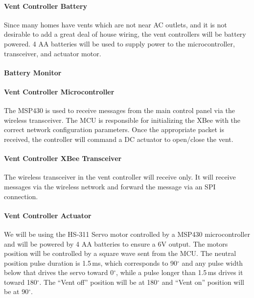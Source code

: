 \paragraph{Vent Controller Battery}
Since many homes have vents which are not near AC outlets, and it is not desirable to add a great deal of house wiring, the vent controllers will be battery powered.  4 AA batteries will be used to supply power to the microcontroller, transceiver, and actuator motor.
\paragraph{Battery Monitor}
\paragraph{Vent Controller Microcontroller}
The MSP430 is used to receive messages from the main control panel via the wireless transceiver.  The MCU is responsible for initializing the XBee with the correct network configuration parameters.  Once the appropriate packet is received, the controller will command a DC actuator to open/close the vent.
\paragraph{Vent Controller XBee Transceiver}
The wireless transceiver in the vent controller will receive only. It will receive messages via the wireless network and forward the message via an SPI connection.
\paragraph{Vent Controller Actuator}
We will be using the HS-311 Servo motor controlled by a MSP430 microcontroller and will be powered by 4 AA batteries to ensure a 6V output. The motors position will be controlled by a square wave sent from the MCU. The neutral position pulse duration is 1.5\,ms, which corresponds to 90$^{\circ}$ and any pulse width below that drives the servo toward 0$^{\circ}$, while a pulse longer than 1.5\,ms drives it toward 180$^{\circ}$. The ``Vent off'' position will be at 180$^{\circ}$ and ``Vent on'' position will be at 90$^{\circ}$.
